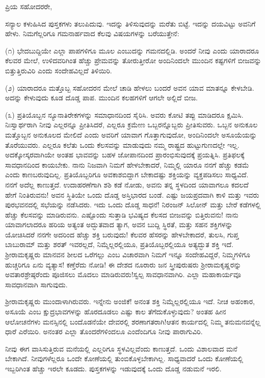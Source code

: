 \noindent
ಪ್ರಿಯ ಸಹೋದರರೇ,

ಸನ್ಯಾಲ ಕಳುಹಿಸಿದ ಪುಸ್ತಕಗಳು ತಲುಪಿದುವು. ಇದನ್ನು ತಿಳಿಸುವುದನ್ನು ಮರೆತು ಬಿಟ್ಟೆ. ಇದನ್ನು ದಯವಿಟ್ಟು ಅವನಿಗೆ ಹೇಳು. ನಿಮಗೆಲ್ಲರಿಗೂ ಗಮನಾರ್ಹವಾದ ಕೆಲವು ವಿಷಯಗಳನ್ನು ಬರೆಯುತ್ತೇನೆ:

(೧) ಭೇದಬುದ್ದಿಯೇ ಎಲ್ಲಾ ಪಾಪಗಳಿಗೂ ಮೂಲ ಎಂಬುದನ್ನು ಗಮನದಲ್ಲಿಡಿ. ಅಂದರೆ ನೀವು ಎಂದು ಯಾರಾದರೂ ಕೆಲವರ ಮೇಲೆ, ಉಳಿದವರಿಗಿಂತ ಹೆಚ್ಚು ಪ್ರೇಮವನ್ನು ತೋರುತ್ತೀರೋ ಅಂದಿನಿಂದಲೇ ಮುಂದಿನ ಕಷ್ಟಗಳಿಗೆ ಬೀಜವನ್ನು ಬಿತ್ತುತ್ತಿರುವಿರಿ ಎಂದು ಸಂದೇಹವಿಲ್ಲದೆ ತಿಳಿಯಿರಿ.

(೨) ಯಾರಾದರೂ ಮತ್ತೊಬ್ಬ ಸಹೋದರನ ಮೇಲೆ ಚಾಡಿ ಹೇಳಲು ಬಂದರೆ ಅವನ ಯಾವ ಮಾತನ್ನೂ ಕೇಳಬೇಡಿ. ಅದನ್ನು ಕೇಳುವುದು ಕೂಡ ದೊಡ್ಡ ಪಾಪ. ಮುಂದಿನ ಕಲಹಗಳಿಗೆ ಆಗಲೇ ಅಲ್ಲಿದೆ ಬೀಜ.

(೩) ಪ್ರತಿಯೊಬ್ಬನ ನ್ಯೂನಾತಿರೇಕಗಳನ್ನು ಸಮಾಧಾನದಿಂದ ಸೈರಿಸಿ. ಅವರು ಕೋಟಿ ತಪ್ಪು ಮಾಡಿದರೂ ಕ್ಷಮಿಸಿ. ನಿಃಸ್ವಾರ್ಥರಾಗಿ ನೀವು ಎಲ್ಲರನ್ನೂ ಪ್ರೀತಿಸಿದರೆ, ಎಲ್ಲರೂ ಕ್ರಮೇಣ ಒಬ್ಬರನ್ನೊಬ್ಬರು ಪ್ರೀತಿಸುವರು. ಒಬ್ಬನ ಅನುಕೂಲ ಮತ್ತೊಬ್ಬನ ಅನುಕೂಲದ ಮೇಲಿದೆ ಎಂದು ಅವರಿಗೆ ಯಾವಾಗ ಗೊತ್ತಾಗುವುದೋ, ಅಂದಿನಿಂದಲೇ ಅಸೂಯೆಯನ್ನು ತೊರೆಯುವರು. ಎಲ್ಲರೂ ಕಲೆತು ಒಂದು ಕೆಲಸವನ್ನು ಮಾಡುವುದು ನಮ್ಮ ರಾಷ್ಟ್ರದ ಹುಟ್ಟುಗುಣದಲ್ಲೇ ಇಲ್ಲ. ಅದಕ್ಕೋಸ್ಕರವಾಗಿಯೇ ಅಂತಹ ಭಾವವನ್ನು ಬಹಳ ಜೋಪಾನದಿಂದ ಪ್ರಾರಂಭಿಸುವುದಕ್ಕೆ ಪ್ರಯತ್ನಿಸಿ. ಪ್ರತಿಫಲಕ್ಕೆ ಸಾವಧಾನದಿಂದ ಕಾಯಬೇಕು. ನಾನು ನಿಜವಾಗಿ ನಿಮಗೆ ಹೇಳಬೇಕಾದರೆ, ನಿಮ್ಮಲ್ಲಿ ಯಾರೂ ನನಗೆ ಹೆಚ್ಚು ಕಡಮೆ ಎಂದು ಕಾಣಬರುವುದಿಲ್ಲ. ಪ್ರತಿಯೊಬ್ಬರಿಗೂ ಅವಕಾಶಬಿದ್ದಾಗ ಬೇಕಾದಷ್ಟು ಶಕ್ತಿಯನ್ನು ವ್ಯಕ್ತಪಡಿಸಲು ಸಾಧ್ಯವಿದೆ. ನನಗೆ ಅದೆಲ್ಲ ಕಾಣುತ್ತದೆ. ಉದಾಹರಣೆಗಾಗಿ ಶಶಿ ಕಡೆ ನೋಡು, ಅವನು ತನ್ನ ಸ್ಥಳದಿಂದ ಯಾವಾಗಲೂ ಕದಲದೆ ಹೇಗೆ ನಿಂತಿರುವನು! ಅವನ ಸ್ಥಿತಿಯೇ ಒಂದು ದೊಡ್ಡ ಅಸ್ತಿಭಾರದ ಬಂಡೆ. ಎಷ್ಟು ಜಯಪ್ರದವಾಗಿ ಕಾಳಿ ಮತ್ತು ಇವರು ಪುರಭವನದಲ್ಲಿ ಸಭೆಯನ್ನು ನಡೆಸಿದರು. ಇದು ಒಂದು ದೊಡ್ಡ ಸಾಧನೆ! ನಿರಂಜನ್ ಸಿಲೋನ್ ಮತ್ತು ಬೇರೆ ಕಡೆಗಳಲ್ಲಿ ಹೆಚ್ಚು ಕೆಲಸವನ್ನು ಮಾಡಿರುವನು. ಎಷ್ಟೊಂದು ಸುತ್ತಾಡಿ ಭವಿಷ್ಯದ ಕೆಲಸದ ಬೀಜವನ್ನು ಬಿತ್ತಿರುವನು! ನಾನು ಯಾವಾಗಲಾದರೂ ಹರಿಯ ಅತ್ಯಂತ ಅದ್ಭುತವಾದ ತ್ಯಾಗ, ಅವನ ಬುದ್ದಿ ಸ್ಥಿರತೆ, ಮತ್ತು ಸಹನ ಶಕ್ತಿಗಳನ್ನು ಯೋಚಿಸಿದರೆ ನನಗೇ ಅದರಿಂದ ಹೆಚ್ಚು ಶಕ್ತಿ ಬರುವುದು! ಕೆಲವರ ಹೆಸರನ್ನು ಹೇಳಬೇಕಾದರೆ, ತುಲಸಿ, ಗುಪ್ತ ಬಾಬುರಾಮ್ ಮತ್ತು ಶರತ್‌ ಇವರಲ್ಲದೆ, ನಿಮ್ಮೆಲ್ಲರಲ್ಲಿಯೂ, ಪ್ರತಿಯೊಬ್ಬರಲ್ಲಿಯೂ ಅತ್ಯದ್ಭುತ ಶಕ್ತಿ ಇದೆ. ಶ‍್ರೀರಾಮಕೃಷ್ಣರು ಮಾನವನ ಶೀಲದ ಒರೆಗಲ್ಲು ಎಂಬ ವಿಚಾರವಾಗಿ ನಿಮಗೆ ಇನ್ನೂ ಸಂದೇಹವಿದ್ದರೆ, ನಿಮ್ಮಗಳಿಗೂ ಹುಚ್ಚರಿಗೂ ಏನು ವ್ಯತ್ಯಾಸ! ಕಣ್ತೆರೆದು ನೋಡಿ! ಈ ದೇಶದ ನೂರಾರು ಜನ ಸ್ತ್ರೀಪುರುಷರು ಶ‍್ರೀರಾಮಕೃಷ್ಣರನ್ನು ಅವತಾರಶ್ರೇಷ್ಠರೆಂದು ಪೂಜಿಸಲು ಮೊದಲು ಮಾಡಿರುವರು!ಸ್ವಲ್ಪ ಸಾವಧಾನವಾಗಿರಿ. ಎಲ್ಲಾ ಮಹಾಕಾರ್ಯವೂ ಸಾವಧಾನವಾಗಿ ಸಾಗುವುದು.

ಶ‍್ರೀರಾಮಕೃಷ್ಣರು ಮುಂದಾಳಾಗಿರುವರು. ಇನ್ನೇನು ಅಂಜಿಕೆ! ಅನಂತ ಶಕ್ತಿ ನಿಮ್ಮೆಲ್ಲ\break ರಲ್ಲಿಯೂ ಇದೆ. ನೀಚ ಅಹಂಕಾರ, ಅಸೂಯೆ ಎಂಬ ಕ್ಷುದ್ರಭಾವಗಳನ್ನು ಹೊರದೂಡಲು ಎಷ್ಟು ಕಾಲ ತೆಗೆದುಕೊಳ್ಳುವುದು? ಅಂತಹ ಹೀನ ಆಲೋಚನೆಗಳು ಮನಸ್ಸಿನಲ್ಲಿ ಬಂದೊಡನೆಯೇ ದೇವರಲ್ಲಿ ಶರಣಾಗತರಾಗಿ!ಆತನ ಕಾರ್ಯದಲ್ಲಿ ನಿಮ್ಮ ತನುಮನವನ್ನೆಲ್ಲ ಧಾರೆ ಎರೆಯಿರಿ. ಅನಂತರ ಎಲ್ಲಾ ತೊಂದರೆಗಳಿಂದಲೂ ಎಂದೆಂದಿಗೂ ನೀವು ಪಾರಾಗುವಿರಿ.

ನೀವು ಈಗ ವಾಸಿಸುತ್ತಿರುವ ಮನೆಯಲ್ಲಿ ಎಲ್ಲರಿಗೂ ಸ್ಥಳವಿಲ್ಲವೆಂದು ಕಾಣುತ್ತದೆ. ಒಂದು ವಿಶಾಲವಾದ ಮನೆ ಬೇಕಾಗಿದೆ. ನೀವುಗಳೆಲ್ಲರೂ ಒಂದೇ ಕೋಣೆಯಲ್ಲಿ ತುಂಬಿಕೊಳ್ಳಬೇಕಾಗಿಲ್ಲ. ಸಾಧ್ಯವಾದರೆ ಒಂದು ಕೋಣೆಯಲ್ಲಿ ಇಬ್ಬರಿಗಿಂತ ಹೆಚ್ಚು ಇರಲೇ ಕೂಡದು. ಪುಸ್ತಕಗಳನ್ನು ಇಡುವುದಕ್ಕೆ ಒಂದು ದೊಡ್ಡ ನಡುಮನೆ ಇರಲಿ.


